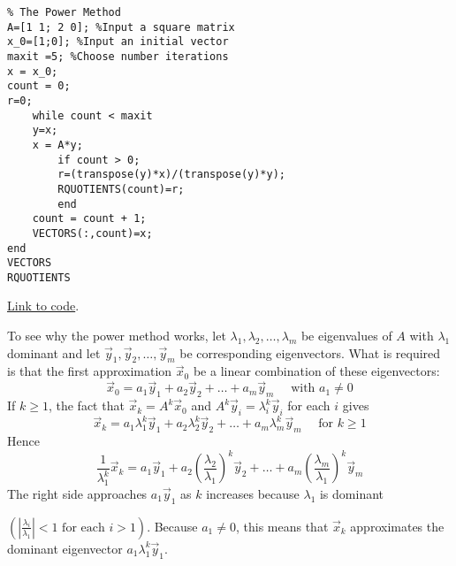 \documentclass{ximera}
\begin{document}
\begin{exploration}
\begin{verbatim}
% The Power Method
A=[1 1; 2 0]; %Input a square matrix
x_0=[1;0]; %Input an initial vector
maxit =5; %Choose number iterations
x = x_0;
count = 0;
r=0;
    while count < maxit
    y=x;
    x = A*y;
        if count > 0; 
        r=(transpose(y)*x)/(transpose(y)*y);
        RQUOTIENTS(count)=r;
        end
    count = count + 1;
    VECTORS(:,count)=x;
end
VECTORS
RQUOTIENTS
\end{verbatim}

\href{https://sagecell.sagemath.org/?z=eJxVkEFLAzEQhe-B_Id3Key2gq3gxW2EUnroQavt6kVEYhvZQDep2azN_nuTTaTrHJLMvDffDBmhrASe9FkYPAhb6QMlC_Y2w6zADabvBUZrdWotOJrvlhuBmlsjHSXuY-p9xdCiIJW0kh_xI_ZWG0pq7qQFu_WeZaV1I6Da-tPPklYYbqVWjSeBwdMKSva6Vd6O8DYsnPBxruRRIGpz9MgodMwlS0Asxl3KQsiv1HHvabjUDcus4ao5-WWyLh-7_Pp_ocsHlO3zy6Zcrx7LXdbTcmYGqlCHmPztHe-J_7xYf10ty812l91dpe6wb9-VFEouE34BmX5s1w==&lang=octave&interacts=eJyLjgUAARUAuQ==}{Link to code}.

\end{exploration}


To see why the power method works, let $\lambda_{1}, \lambda_{2}, \dots, \lambda_{m}$ be eigenvalues of $A$ with $\lambda_{1}$ dominant and let $\vec{y}_{1}, \vec{y}_{2}, \dots, \vec{y}_{m}$ be corresponding eigenvectors. What is required is that the first approximation $\vec{x}_{0}$ be a linear combination of these eigenvectors:
\begin{equation*}
\vec{x}_{0} = a_{1}\vec{y}_{1} + a_{2}\vec{y}_{2} + \dots + a_{m}\vec{y}_{m} \quad \mbox{ with } a_{1} \neq 0
\end{equation*}
If $k \geq 1$, the fact that $\vec{x}_{k} = A^{k}\vec{x}_{0}$ and $A^k\vec{y}_{i} = \lambda_{i}^k\vec{y}_{i}$ for each $i$ gives
\begin{equation*}
\vec{x}_{k} = a_{1}\lambda_{1}^k\vec{y}_{1} + a_{2}\lambda_{2}^k\vec{y}_{2} + \dots + a_{m}\lambda_{m}^k\vec{y}_{m} \quad \mbox{ for } k \geq 1
\end{equation*}
Hence
\begin{equation*}
\frac{1}{\lambda_{1}^k}\vec{x}_{k} = a_{1}\vec{y}_{1} + a_{2}\left(\frac{\lambda_{2}}{\lambda_{1}}\right)^k\vec{y}_{2} + \dots + a_{m}\left(\frac{\lambda_{m}}{\lambda_{1}}\right)^k\vec{y}_{m}
\end{equation*}
The right side approaches $a_{1}\vec{y}_{1}$ as $k$ increases because $\lambda_{1}$ is dominant 

$\left( \left|\frac{\lambda_{i}}{\lambda_{1}} \right| < 1 \mbox{ for each } i > 1 \right)$. Because $a_{1} \neq 0$, this means that $\vec{x}_{k}$ approximates the dominant eigenvector $a_{1}\lambda_{1}^k\vec{y}_{1}$.
\end{document}
